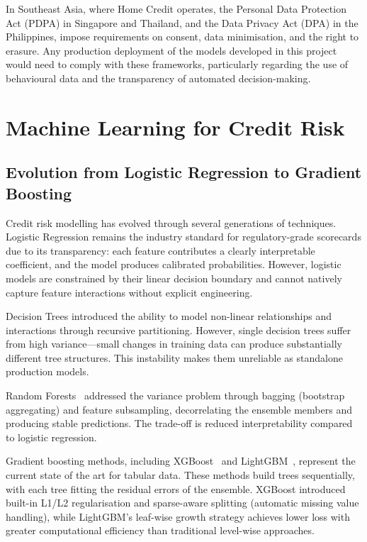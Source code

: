 In Southeast Asia, where Home Credit operates, the Personal Data Protection Act (PDPA) in Singapore and Thailand, and the Data Privacy Act (DPA) in the Philippines, impose requirements on consent, data minimisation, and the right to erasure. Any production deployment of the models developed in this project would need to comply with these frameworks, particularly regarding the use of behavioural data and the transparency of automated decision-making.

\section{Machine Learning for Credit Risk}
\label{sec:ml_credit_risk}

\subsection{Evolution from Logistic Regression to Gradient Boosting}

Credit risk modelling has evolved through several generations of techniques. Logistic Regression remains the industry standard for regulatory-grade scorecards due to its transparency: each feature contributes a clearly interpretable coefficient, and the model produces calibrated probabilities. However, logistic models are constrained by their linear decision boundary and cannot natively capture feature interactions without explicit engineering.

Decision Trees introduced the ability to model non-linear relationships and interactions through recursive partitioning. However, single decision trees suffer from high variance---small changes in training data can produce substantially different tree structures. This instability makes them unreliable as standalone production models.

Random Forests~\cite{breiman2001} addressed the variance problem through bagging (bootstrap aggregating) and feature subsampling, decorrelating the ensemble members and producing stable predictions. The trade-off is reduced interpretability compared to logistic regression.

Gradient boosting methods, including XGBoost~\cite{chen2016} and LightGBM~\cite{ke2017}, represent the current state of the art for tabular data. These methods build trees sequentially, with each tree fitting the residual errors of the ensemble. XGBoost introduced built-in L1/L2 regularisation and sparse-aware splitting (automatic missing value handling), while LightGBM's leaf-wise growth strategy achieves lower loss with greater computational efficiency than traditional level-wise approaches.

